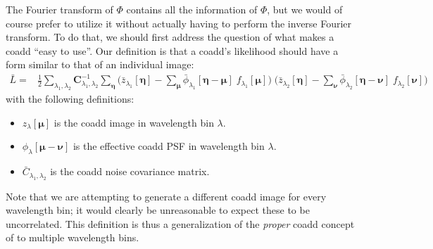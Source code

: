 \documentclass[DM,authoryear,toc]{lsstdoc}
\begin{document}
The Fourier transform of $\Phi$ contains all the information of $\Phi$, but we would of course prefer to utilize it without actually having to perform the inverse Fourier transform.
To do that, we should first address the question of what makes a coadd ``easy to use''.
Our definition is that a coadd's likelihood should have a form similar to that of an individual image:
\begin{align}
\bar{L} =&
    \frac{1}{2}
    \sum_{\lambda_1,\lambda_2}
    \bm{C}^{-1}_{\lambda_1,\lambda_2}
    \sum_{\bm{\eta}}
    \bigg(
        \bar{z}_{\lambda_1}[\bm{\eta}]
        - \sum_{\bm{\mu}}\bar{\phi}_{\lambda_1}[\bm{\eta}-\bm{\mu}]
        \; f_{\lambda_1}[\bm{\mu}]
    \bigg)
    \;
    \bigg(
        \bar{z}_{\lambda_2}[\bm{\eta}]
        - \sum_{\bm{\nu}}\bar{\phi}_{\lambda_2}[\bm{\eta}-\bm{\nu}]
        \; f_{\lambda_2}[\bm{\nu}]
    \bigg)
    \label{eqn:natural-coadd-likelihood}
\end{align}
with the following definitions:
\begin{itemize}
    \item $z_{\lambda}[\bm{\mu}]$ is the coadd image in wavelength bin $\lambda$.
    \item $\phi_{\lambda}[\bm{\mu}-\bm{\nu}]$ is the effective coadd PSF in wavelength bin $\lambda$.
    \item $\bar{C}_{\lambda_1,\lambda_2}$ is the coadd noise covariance matrix.
\end{itemize}
Note that we are attempting to generate a different coadd image for every wavelength bin; it would clearly be unreasonable to expect these to be uncorrelated.
This definition is thus a generalization of the \emph{proper} coadd concept of \citet{2015arXiv151206879Z} to multiple wavelength bins.
\end{document}
